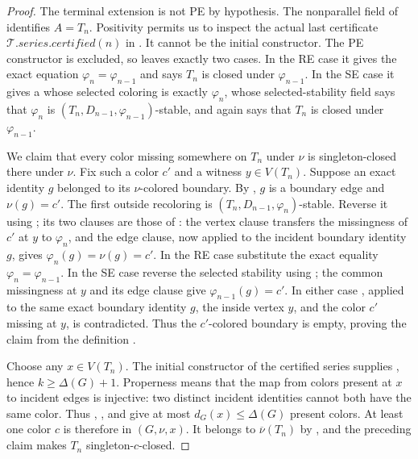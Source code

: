 \begin{proof}
The terminal extension is not PE by hypothesis.  The nonparallel field
of  identifies $A=T_n$.  Positivity permits us to
inspect the actual last certificate
$\mathcal T.\mathit{series.certified}(n)$ in
.  It cannot be the initial constructor.  The
PE constructor is excluded, so  leaves
exactly two cases.  In the RE case it gives the exact equation
$\varphi_n=\varphi_{n-1}$ and says $T_n$ is closed under
$\varphi_{n-1}$.  In the SE case it gives a
 whose selected coloring is exactly
$\varphi_n$, whose selected-stability field says that $\varphi_n$ is
$(T_n,D_{n-1},\varphi_{n-1})$-stable, and again says that $T_n$ is closed
under $\varphi_{n-1}$.

We claim that every color missing somewhere on $T_n$ under $\nu$ is
singleton-closed there under $\nu$.  Fix such a color $c'$ and a witness
$y\in V(T_n)$.  Suppose an exact identity $g$ belonged to its
$\nu$-colored boundary.  By , $g$ is a
boundary edge and $\nu(g)=c'$.  The first outside recoloring is
$(T_n,D_{n-1},\varphi_n)$-stable.  Reverse it using ; its
two clauses are those of : the vertex clause
transfers the missingness of $c'$ at $y$ to $\varphi_n$, and the edge
clause, now applied to the incident boundary identity $g$, gives
$\varphi_n(g)=\nu(g)=c'$.  In the RE case substitute the exact equality
$\varphi_n=\varphi_{n-1}$.  In the SE case reverse the selected stability
using ; the common missingness at $y$ and its edge clause
give $\varphi_{n-1}(g)=c'$.  In either case
, applied to the same exact boundary
identity $g$, the inside vertex $y$, and the color $c'$ missing at $y$,
is contradicted.  Thus the $c'$-colored boundary is empty, proving the
claim from the definition .

Choose any $x\in V(T_n)$.  The initial constructor of the certified
series supplies , hence $k\geq\Delta(G)+1$.
Properness means that the map from colors present at $x$ to incident
edges is injective: two distinct incident identities cannot both have
the same color.  Thus , , and
 give at most
$d_G(x)\leq\Delta(G)$ present colors.  At least one color $c$ is
therefore in $(G,\nu,x)$.  It belongs to
$\overline\nu(T_n)$ by , and the preceding
claim makes $T_n$ singleton-$c$-closed.


\end{proof}
